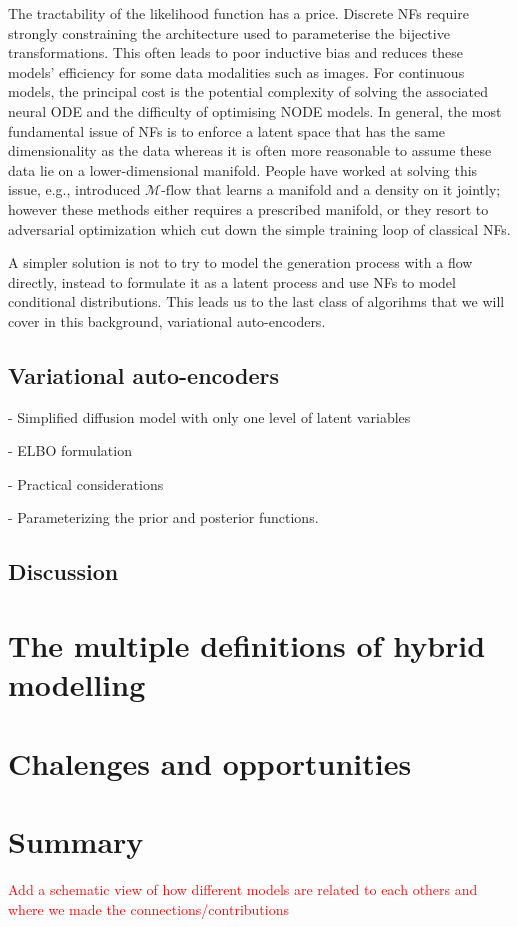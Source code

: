 The tractability of the likelihood function has a price. Discrete NFs require strongly constraining the architecture used to parameterise the bijective transformations. This often leads to poor inductive bias and reduces these models' efficiency for some data modalities such as images. For continuous models, the principal cost is the potential complexity of solving the associated neural ODE and the difficulty of optimising NODE models. In general, the most fundamental issue of NFs is to enforce a latent space that has the same dimensionality as the data whereas it is often more reasonable to assume these data lie on a lower-dimensional manifold. People have worked at solving this issue, e.g., \citet{brehmer2020flows} introduced $\mathcal{M}\text{-flow}$ that learns a manifold and a density on it jointly; however these methods either requires a prescribed manifold, or they resort to adversarial optimization which cut down the simple training loop of classical NFs.

A simpler solution is not to try to model the generation process with a flow directly, instead to formulate it as a latent process and use NFs to model conditional distributions. This leads us to the last class of algorihms that we will cover in this background, variational auto-encoders.

\subsection{Variational auto-encoders}
- Simplified diffusion model with only one level of latent variables

- ELBO formulation

- Practical considerations

- Parameterizing the prior and posterior functions.
\subsection{Discussion}

\section{The multiple definitions of hybrid modelling}

\section{Chalenges and opportunities}

\section{Summary}

\textcolor{red}{Add a schematic view of how different models are related to each others and where we made the connections/contributions}
